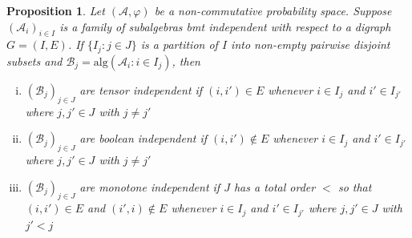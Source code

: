 \documentclass[a4paper,12pt]{extarticle}
\newtheorem{prop}[thm]{Proposition}
\theoremstyle{definition}
\theoremstyle{remark}
\begin{document}
\begin{prop}\label{prop_associativity}
	Let $(\mathcal{A},\varphi)$ be a non-commutative probability space. 
	Suppose $(\mathcal{A}_i)_{i \in I}$ is a family of subalgebras bmt independent with respect to a digraph $G = (I,E)$. 
	If $\{ I_j : j \in J \}$ is a partition of $I$ into non-empty pairwise disjoint subsets and $\mathcal{B}_j = \mathrm{alg}( \mathcal{A}_i : i \in I_j )$, then  
	\begin{enumerate}[(i)]
		
		
		\item $(\mathcal{B}_j)_{j \in J}$ are tensor independent if $(i,i') \in E$ whenever $i \in I_{j}$ and $i' \in I_{j'}$ where $j,j' \in J$ with $j \neq j'$  
		
		\item $(\mathcal{B}_j)_{j \in J}$ are boolean independent if $(i,i') \notin E$ whenever $i \in I_{j}$ and $i' \in I_{j'}$ where $j,j' \in J$ with $j \neq j'$  
		
		
		\item $(\mathcal{B}_j)_{j \in J}$ are monotone independent if $J$ has a total order $<$ so that $(i,i') \in E$ and $(i',i) \notin E$  whenever $i \in I_{j}$ and $i' \in I_{j'}$ where $j,j' \in J$ with $j' < j$   
		
		
		
	\end{enumerate}
\end{prop}
\end{document}
